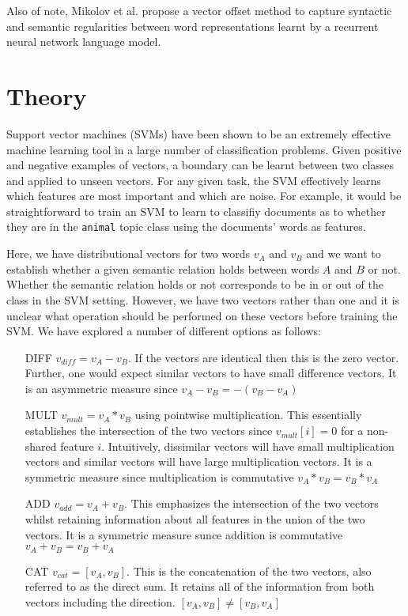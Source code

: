\documentclass[11pt]{article}
\begin{document}
Also of note, Mikolov et al.  propose a vector offset method to capture syntactic and semantic regularities between word representations learnt by a recurrent neural network language model.

\section{Theory}
\label{sect:theory}
Support vector machines (SVMs) have been shown to be an extremely effective machine learning tool in a large number of classification problems.  Given positive and negative examples of vectors, a boundary can be learnt between two classes and applied to unseen vectors.  For any given task, the SVM effectively learns which features are most important and which are noise.  For example, it would be straightforward to train an SVM to learn to classifiy documents as to whether they are in the \texttt{animal} topic class using the documents' words as features.     

Here, we have distributional vectors for two words $v_A$ and $v_B$ and we want to establish whether a given semantic relation holds between words $A$ and $B$ or not.  Whether the semantic relation holds or not corresponds to be in or out of the class in the SVM setting.  However, we have two vectors rather than one and it is unclear what operation should be performed on these vectors before training the SVM.  We have explored a number of different options as follows:

\begin{itemize}
\item[DIFF]{$v_{diff} = v_A - v_B$.  If the vectors are identical then this is the zero vector.  Further, one would expect similar vectors to have small difference vectors.  It is an asymmetric measure since $v_A - v_B = -(v_B - v_A)$ }
\item[MULT]{$v_{mult} = v_A * v_B$ using pointwise multiplication.  This essentially establishes the intersection of the two vectors since $v_{mult}[i] = 0$ for a non-shared feature $i$.   Intuitively,  dissimilar vectors will have small multiplication vectors and similar vectors will have large multiplication vectors.  It is a symmetric measure since multiplication is commutative $v_A * v_B = v_B * v_A$ }
\item[ADD]{$v_{add} = v_A + v_B$.  This emphasizes the intersection of the two vectors whilst retaining information about all features in the union of the two vectors.  It is a symmetric measure sunce addition is commutative $v_A + v_B = v_B + v_A$}
\item[CAT]{$v_{cat} = [v_A,v_B]$.  This is the concatenation of the two vectors, also referred to as the direct sum.  It retains all of the information from both vectors including the direction.    $[v_A,v_B] \neq [v_B,v_A]$}
\end{itemize}
\end{document}
